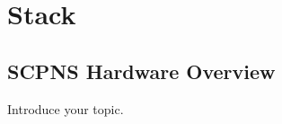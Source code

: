 \chapter[Stack]{Stack}
\label{Chap:Stack}


\section{SCPNS Hardware Overview}

Introduce your topic.

